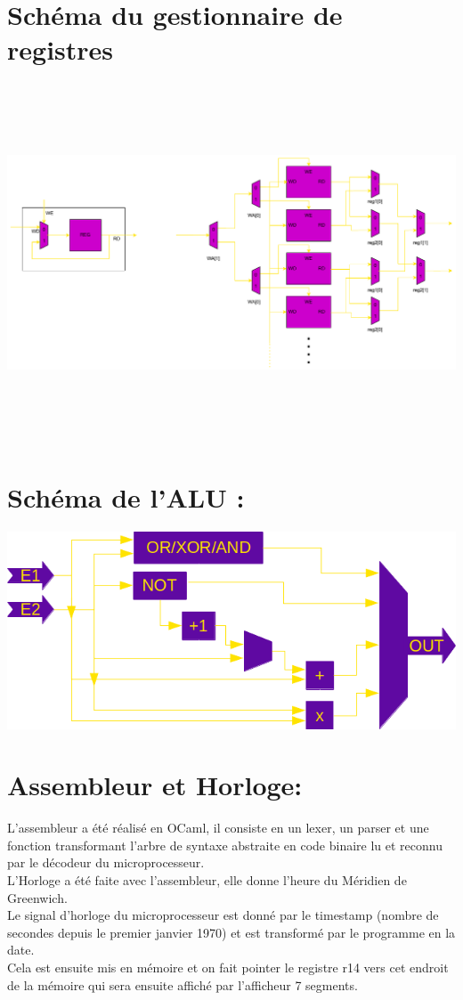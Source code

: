 \documentclass{article}
\begin{document}
		\section{Schéma du gestionnaire de registres}
		\includegraphics[width=14.8cm,height=10.6cm,page=1]{gestionnaire_registres.pdf}
		\newpage
		\section{Schéma de l'ALU :}
		\includegraphics[scale=0.75]{ual.png}
		\newpage
		\section{Assembleur et Horloge:}
		L'assembleur a été réalisé en OCaml, il consiste en un lexer, un parser et une fonction transformant l'arbre de syntaxe abstraite en code binaire lu et reconnu par le décodeur du microprocesseur.\\	
		L'Horloge a été faite avec l'assembleur, elle donne l'heure du Méridien de Greenwich.\\
		Le signal d'horloge du microprocesseur est donné par le timestamp (nombre de secondes depuis le premier janvier 1970) et est transformé par le programme en la date.\\
		Cela est ensuite mis en mémoire et on fait pointer le registre r14 vers cet endroit de la mémoire qui sera ensuite affiché par l'afficheur 7 segments.\\
\end{document}
